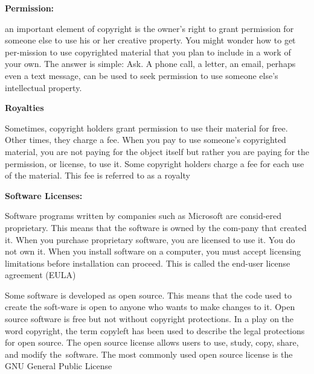 \documentclass{report}
\begin{document}
    \bigbreak \noindent \bigbreak \noindent 
    \begin{Large}
        \textbf{Permission:}
    \end{Large}

    \bigbreak \noindent 
    an important element  of copyright is the owner’s right to grant permission for someone else to use his or her creative property. You might wonder how to get per-mission to use copyrighted material that you plan to include in a work of your own. The answer is simple: Ask. A phone call, a letter, an email, perhaps even a text message, can be used to seek permission to use someone else’s intellectual property.
    
    \bigbreak \noindent \bigbreak \noindent 
    \begin{Large}
        \textbf{Royalties}
    \end{Large}

    \bigbreak \noindent 
    Sometimes, copyright holders grant permission to use their material for free. Other times, they charge a fee. When you pay to use someone’s copyrighted material, you are not paying for the object itself but rather you are paying for the permission, or license, to use it. Some copyright holders charge a fee for each use of the material. This fee is referred to as a royalty

    \bigbreak \noindent 

    \bigbreak \noindent \bigbreak \noindent 
    \begin{Large}
        \textbf{Software Licenses:}
    \end{Large}

    \bigbreak \noindent 
    Software programs written by companies such as Microsoft are consid-ered proprietary. This means that the software is owned by the com-pany that created it. When you purchase proprietary software, you are licensed to use it. You do not own it. When you install software on a computer, you must accept licensing limitations before installation can proceed. This is called the end-user license agreement (EULA)

    \bigbreak \noindent 
    Some software is developed as open source. This means that the code used to create the soft-ware is open to anyone who wants to make changes to it. Open source software is free but not without copyright protections. In a play on the word copyright, the term copyleft has been used to describe the legal protections for open source. The open source license allows users to use, study, copy, share, and modify the software. The most commonly used open source license is the GNU General Public License
\end{document}
